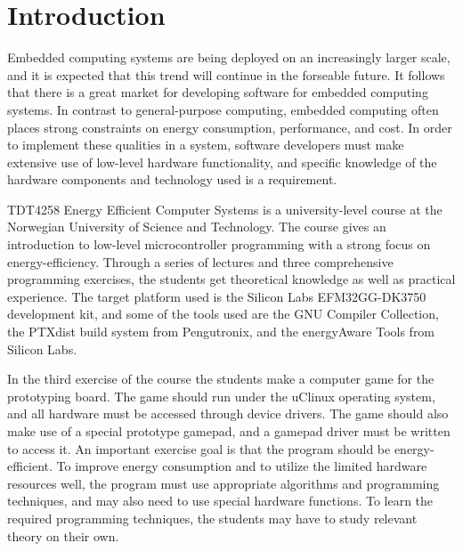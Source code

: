\chapter{Introduction}

Embedded computing systems are being deployed on an increasingly larger scale, and it is expected that this trend will continue in the forseable future. It follows that there is a great market for developing software for embedded computing systems. In contrast to general-purpose computing, embedded computing often places strong constraints on energy consumption, performance, and cost. In order to implement these qualities in a system, software developers must make extensive use of low-level hardware functionality, and specific knowledge of the hardware components and technology used is a requirement. 

TDT4258 Energy Efficient Computer Systems is a university-level course at the Norwegian University of Science and Technology.
The course gives an introduction to low-level microcontroller programming with a strong focus on energy-efficiency. Through a series of lectures and three comprehensive programming exercises, the students get theoretical knowledge as well as practical experience.\cite{ntnu-web-tdt4258} The target platform used is the Silicon Labs EFM32GG-DK3750 development kit, and some of the tools used are the GNU Compiler Collection, the PTXdist build system from Pengutronix, and the energyAware Tools from Silicon Labs.\cite{compendium}

In the third exercise of the course the students make a computer game for the prototyping board. The game should run under the uClinux operating system, and all hardware must be accessed through device drivers. The game should also make use of a special prototype gamepad, and a gamepad driver must be written to access it. An important exercise goal is that the program should be energy-efficient. To improve energy consumption and to utilize the limited hardware resources well, the program must use appropriate algorithms and programming techniques, and may also need to use special hardware functions. To learn the required programming techniques, the students may have to study relevant theory on their own.\cite{compendium}

